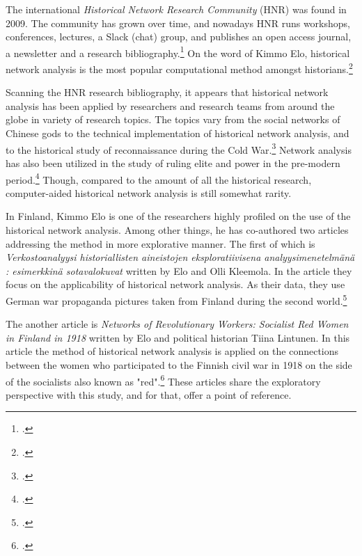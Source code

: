 \documentclass[a4paper,12pt]{article}
\begin{document}
\begin{onehalfspace}
The international \textit{Historical Network Research Community} (HNR) was found in 2009. The community has grown over time, and nowadays HNR runs workshops, conferences, lectures, a Slack (chat) group, and publishes an open access journal, a newsletter and a research bibliography.\footcite{hnr} On the word of Kimmo Elo, historical network analysis is the most popular computational method amongst historians.\footcite[p. 22.]{elo16} 

Scanning the HNR research bibliography, it appears that historical network analysis has been applied by researchers and research teams from around the globe in variety of research topics. The topics vary from the social networks of Chinese gods to the technical implementation of historical network analysis, and to the historical study of reconnaissance during the Cold War.\footcites[p. 22.]{elo16}{hnrbib} Network analysis has also been utilized in the study of ruling elite and power in the pre-modern period.\footcite[See e. g. Ruth Ahnert's and Sebastian E. Ahnert's book \textit{Tudor Networks of Power} (2023) or Paul D Mclean's article \textit{Widening Access While Tightening Control: Office-Holding, Marriages, and Elite Consolidation in Early Modern Poland} (2004).]{JonVidarEt} Though, compared to the amount of all the historical research, computer-aided historical network analysis is still somewhat rarity.
 
In Finland, Kimmo Elo is one of the researchers highly profiled on the use of the historical network analysis. Among other things, he has co-authored two articles addressing the method in more explorative manner. The first of which is \textit{Verkostoanalyysi historiallisten aineistojen eksploratiivisena analyysimenetelmänä : esimerkkinä sotavalokuvat} written by Elo and Olli Kleemola. In the article they focus on the applicability of historical network analysis. As their data, they use German war propaganda pictures taken from Finland during the second world.\footcite{eloAklee15}

The another article is \textit{Networks of Revolutionary Workers: Socialist Red Women in Finland in 1918} written by Elo and political historian Tiina Lintunen. In this article the method of historical network analysis is applied on the connections between the women who participated to the Finnish civil war in 1918 on the side of the socialists also known as "red".\footcite[Almost the same article is found in Finnish in the \textit{Historiallinen Aikakauskirja} 116 (2/2018).]{LintunenAndElo2019} These articles share the exploratory perspective with this study, and for that, offer a point of reference. 


\end{onehalfspace}
\end{document}
